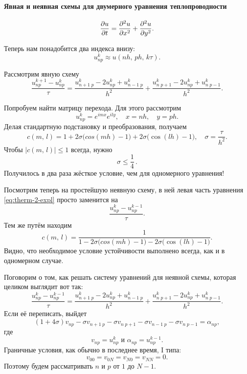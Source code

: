 \documentclass{trlnotes}
\begin{document}
    \paragraph{Явная и неявная схемы для двумерного уравнения теплопроводности}

    \begin{de}
        \[
            \dfrac{\partial u}{\partial t} = \dfrac{\partial^2 u}{\partial x^2} + \dfrac{\partial^2 u}{\partial y^2}.
        \]
    \end{de}

    Теперь нам понадобится два индекса внизу:
    \[
        u^k_{np} \approx u(nh, \, ph, \, k\tau).
    \]

    Рассмотрим явную схему
    \begin{equation}\label{eq:therm-2-expl}
        \dfrac{u^{k+1}_{np} - u^k_{np}}{\tau} = \dfrac{u^k_{n+1 \; p} - 2u^k_{np} + u^k_{n-1 \; p}}{h^2} + \dfrac{u^k_{n \; p+1} - 2u^k_{np} + u^k_{n \; p - 1}}{h^2}.
    \end{equation}

    Попробуем найти матрицу перехода. Для этого рассмотрим 
    \[
        u^k_{np} = e^{imx} e^{ily}, \quad x = nh, \quad y = ph.
    \]
    Делая стандартную подстановку и преобразования, получаем
    \[
        c(m, \, l) = 1 + 2\sigma\big(cos(mh) - 1\big) + 2\sigma\big(\cos(lh) - 1\big), \quad \sigma = \dfrac{\tau}{h^2}.
    \]
    Чтобы $\big|c(m, \, l)\big| \leqslant 1$ всегда, нужно
    \[
        \boxed{\sigma \leqslant \dfrac{1}{4}}\,.
    \]
    Получилось в два раза жёсткое условие, чем для одномерного уравнения!

    Посмотрим теперь на простейшую неявную схему, в ней левая часть уравнения \ref{eq:therm-2-expl} просто заменится на
    \[
        \dfrac{u^{k}_{np} - u^{k-1}_{np}}{\tau}.
    \]
    Тем же путём находим
    \[ 
        c(m, \, l) = \dfrac{1}{1 - 2\sigma\big(cos(mh) - 1\big) - 2\sigma\big(\cos(lh) - 1\big)}.
    \]
    Видно, что необходимое условие устойчивости выполнено всегда, как и в одномерном случае.

    Поговорим о том, как решать систему уравнений для неявной схемы, которая целиком выглядит вот так:
    \[
        \dfrac{u^{k}_{np} - u^{k-1}_{np}}{\tau} = \dfrac{u^k_{n+1 \; p} - 2u^k_{np} + u^k_{n-1 \; p}}{h^2} + \dfrac{u^k_{n \; p+1} - 2u^k_{np} + u^k_{n \; p - 1}}{h^2}.
    \]
    Если её переписать, выйдет
    \[
        (1 + 4\sigma) v_{np} - \sigma v_{n + 1\; p} - \sigma v_{n \; p+1} - \sigma v_{n - 1\; p} - \sigma v_{n \; p-1} = \alpha_{np},
    \]
    где
    \[
        v_{np} = u_{np}^k \text{ и } \alpha_{np} = u^{k-1}_{np}.
    \]
    Граничные условия, как обычно в последнее время, I типа:
    \[
        v_{00} = v_{0N} = v_{N0} = v_{NN} = 0.
    \]
    Поэтому будем рассматривать $n$ и $p$ от $1$ до $N-1$. 
\end{document}
